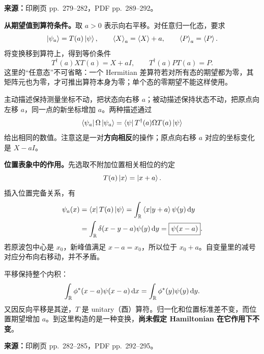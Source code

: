 \textbf{来源：}印刷页 pp.~279--282，PDF pp.~289--292。

\textbf{从期望值到算符条件。}取 $a>0$ 表示向右平移。对任意归一化态，要求
\begin{equation}
  \left|\psi_a\right\rangle=T(a)\left|\psi\right\rangle,\qquad
  \left\langle X \right\rangle_a=\left\langle X \right\rangle+a,\qquad
  \left\langle P \right\rangle_a=\left\langle P \right\rangle.
\end{equation}
将变换移到算符上，得到等价条件
\begin{equation}
  \boxed{T^\dagger(a)XT(a)=X+aI,\qquad
         T^\dagger(a)PT(a)=P}.
  \label{eq:QM-C11-S02-transformed-XP}
\end{equation}
这里的“任意态”不可省略：一个 Hermitian 差算符若对所有态的期望都为零，其矩阵元也为零，才可推出算符本身为零；单个态的零期望不能这样使用。

主动描述保持测量坐标不动，把状态向右移 $a$；被动描述保持状态不动，把原点向左移 $a$，同一点的新坐标增加 $a$。两种描述通过
\begin{equation}
  \left\langle \psi_a\right|\Omega\left|\psi_a\right\rangle
  =\left\langle \psi\right| T^\dagger(a)\Omega T(a)\left|\psi\right\rangle
\end{equation}
给出相同的数值。注意这是一对\textbf{方向相反}的操作；原点向右移 $a$ 对应的坐标变化是 $X-aI$。

\textbf{位置表象中的作用。}先选取不附加位置相关相位的约定
\begin{equation}
  T(a)\left|x\right\rangle=\left|x+a\right\rangle.
\end{equation}
插入位置完备关系，有
\begin{align}
  \psi_a(x)
    &=\left\langle x\right| T(a)\left|\psi\right\rangle
      =\int_{\mathbb{R}}\left\langle x \middle| y+a \right\rangle\psi(y)\mathop{}\!\mathrm{d} y\notag\\
    &=\int_{\mathbb{R}}\delta(x-y-a)\psi(y)\mathop{}\!\mathrm{d} y
      =\boxed{\psi(x-a)}.
\end{align}
若原波包中心是 $x_0$，新峰值满足 $x-a=x_0$，所以位于 $x_0+a$。自变量里的减号对应分布向右移动，并不矛盾。

平移保持整个内积：
\begin{equation}
  \int_{\mathbb{R}}\phi^*(x-a)\psi(x-a)\mathop{}\!\mathrm{d} x
   =\int_{\mathbb{R}}\phi^*(y)\psi(y)\mathop{}\!\mathrm{d} y.
\end{equation}
又因反向平移是其逆，$T$ 是 unitary（酉）算符。归一化和位置标准差不变，而位置期望增加 $a$。到这里构造的是一种变换，\textbf{尚未假定 Hamiltonian 在它作用下不变}。

\textbf{来源：}印刷页 pp.~282--285，PDF pp.~292--295。

